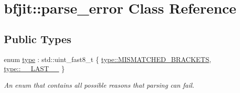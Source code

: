\hypertarget{classbfjit_1_1parse__error}{}\section{bfjit\+:\+:parse\+\_\+error Class Reference}
\label{classbfjit_1_1parse__error}
\subsection*{Public Types}
\begin{DoxyCompactItemize}
\item 
enum \hyperlink{classbfjit_1_1parse__error_af750138d196890dcdc543c9fb1b7705b}{type} \+: std\+::uint\+\_\+fast8\+\_\+t \{ \hyperlink{classbfjit_1_1parse__error_af750138d196890dcdc543c9fb1b7705badb8aa960a3f467cff16772c10e9a4c07}{type\+::\+M\+I\+S\+M\+A\+T\+C\+H\+E\+D\+\_\+\+B\+R\+A\+C\+K\+E\+TS}, 
\hyperlink{classbfjit_1_1parse__error_af750138d196890dcdc543c9fb1b7705ba62bd5a4afef994ba01e631cbf00f85be}{type\+::\+\_\+\+\_\+\+L\+A\+S\+T\+\_\+\+\_\+}
 \}\begin{DoxyCompactList}\small\item\em An enum that contains all possible reasons that parsing can fail. \end{DoxyCompactList}
\end{DoxyCompactItemize}
